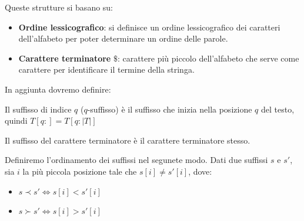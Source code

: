 Queste strutture si basano su:
\begin{itemize}
    \item \textbf{Ordine lessicografico}: si definisce un ordine lessicografico
          dei caratteri dell'alfabeto per poter determinare un ordine delle parole.
    \item \textbf{Carattere terminatore} $\$ $: carattere più piccolo dell'alfabeto che
          serve come carattere per identificare il termine della stringa.
\end{itemize}
In aggiunta dovremo definire:
\begin{definizione}
    Il suffisso di indice $q$ ($q$-suffisso) è il suffisso che inizia nella posizione
    $q$ del testo, quindi $T[q:]= T[q:|T|]$
\end{definizione}
Il suffisso del carattere terminatore è il carattere terminatore stesso.
\begin{definizione}
    Definiremo l'ordinamento dei suffissi nel segunete modo. Dati due suffissi $s$
    e $s'$, sia $i$ la più piccola posizione tale che $s[i]\ne s'[i]$, dove:
    \begin{itemize}
        \item $s \prec s'\iff s[i] < s'[i]$
        \item $s \succ s'\iff s[i] > s'[i]$
    \end{itemize}
\end{definizione}
